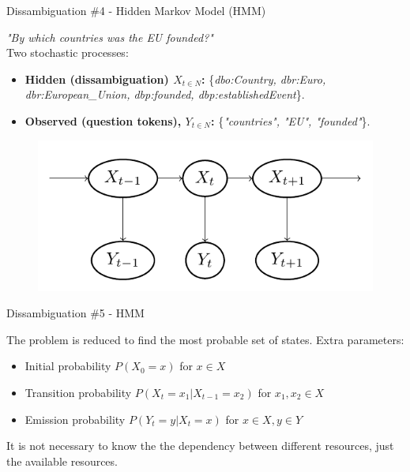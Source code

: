 \documentclass{beamer}
\begin{document}
\begin{frame}{Dissambiguation \#4 - Hidden Markov Model (HMM)}
  \begin{cardTiny}
    \textit{"By which countries was the EU founded?"} \\
    Two stochastic processes:
    \begin{itemize}
      \item \textbf{Hidden (dissambiguation) $X_{t \in N}$:} \{\textit{dbo:Country, dbr:Euro, dbr:European\_Union, dbp:founded, dbp:establishedEvent}\}.
      \item \textbf{Observed (question tokens), $Y_{t \in N}$:} \{\textit{"countries", "EU", "founded"}\}.
    \end{itemize}
  \end{cardTiny}
  \begin{cardTiny}
    \begin{figure}\label{fig:hmm}
      \centering
      \includegraphics[height=0.30\textheight]{./res/hmm.png}
    \end{figure}
  \end{cardTiny}
\end{frame}


\begin{frame}{Dissambiguation \#5 - HMM}
  \begin{card}
    The problem is reduced to find the most probable set of states. Extra parameters:
    \begin{itemize}
      \item Initial probability $P(X_{0} = x)$ for $x \in X$
      \item Transition probability $P(X_{t} = x_{1} | X_{t-1} = x_{2})$ for $x_{1}, x_{2} \in X$
      \item Emission probability $P(Y_{t} = y | X_{t} = x)$ for $x \in X, y \in Y$
    \end{itemize}
    It is not necessary to know the the dependency between different resources, just the available resources.
  \end{card}
\end{frame}
\end{document}
